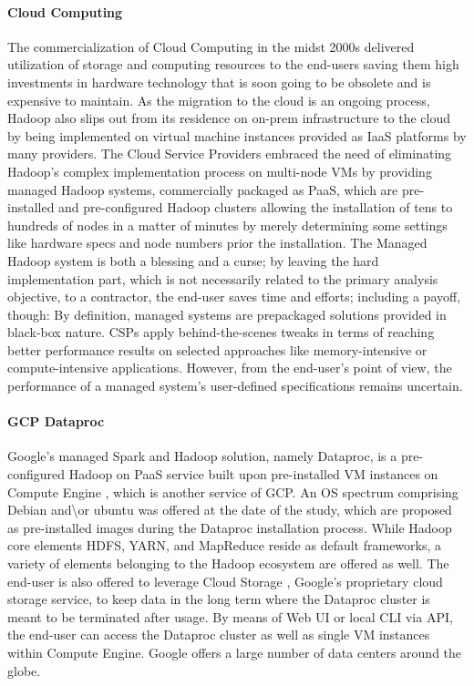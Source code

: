 \documentclass[review]{elsarticle}
\begin{document}
\paragraph{Cloud Computing}The commercialization of Cloud Computing in the midst 2000s \cite{noauthor_announcing_nodate} delivered utilization of storage and computing resources to the end-users saving them high investments in hardware technology that is soon going to be obsolete and is expensive to maintain. As the migration to the cloud is an ongoing process, Hadoop also slips out from its residence on on-prem infrastructure to the cloud by being implemented on virtual machine instances provided as IaaS platforms by many providers. The Cloud Service Providers embraced the need of eliminating Hadoop's complex implementation process on multi-node VMs by providing managed Hadoop systems, commercially packaged as PaaS, which are pre-installed and pre-configured Hadoop clusters allowing the installation of tens to hundreds of nodes in a matter of minutes by merely determining some settings like hardware specs and node numbers prior the installation. The Managed Hadoop system is both a blessing and a curse; by leaving the hard implementation part, which is not necessarily related to the primary analysis objective, to a contractor, the end-user saves time and efforts; including a payoff, though: By definition, managed systems are prepackaged solutions provided in black-box nature. CSPs apply behind-the-scenes tweaks in terms of reaching better performance results on selected approaches like memory-intensive or compute-intensive applications. However, from the end-user's point of view, the performance of a managed system's user-defined specifications remains uncertain.

\paragraph{GCP Dataproc \cite{noauthor_dataproc_nodate}} Google's managed Spark and Hadoop solution, namely Dataproc, is a pre-configured Hadoop on PaaS service built upon pre-installed VM instances on Compute Engine \cite{noauthor_compute_nodate}, which is another service of GCP. An OS spectrum comprising Debian and\textbackslash{or} ubuntu was offered at the date of the study, which are proposed as pre-installed images during the Dataproc installation process. While Hadoop core elements HDFS, YARN, and MapReduce reside as default frameworks, a variety of elements belonging to the Hadoop ecosystem are offered as well. The end-user is also offered to leverage Cloud Storage \cite{noauthor_cloud_nodate}, Google's proprietary cloud storage service, to keep data in the long term where the Dataproc cluster is meant to be terminated after usage. By means of Web UI or local CLI via API, the end-user can access the Dataproc cluster as well as single VM instances within Compute Engine. Google offers a large number of data centers around the globe.
\end{document}
